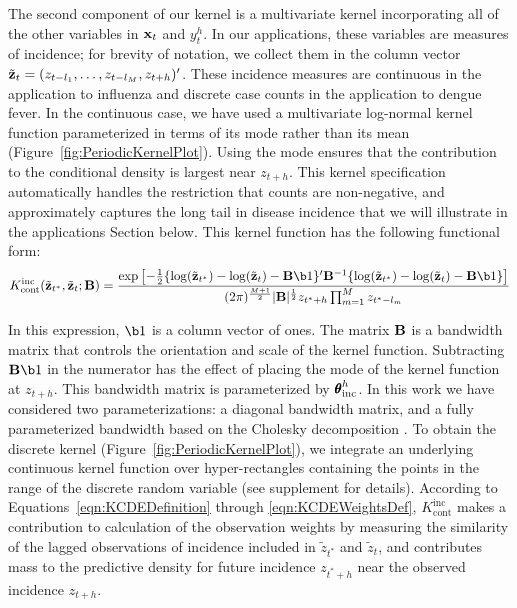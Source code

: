 \documentclass[times, doublespace]{simauth}\usepackage[]{graphicx}\usepackage[]{color}
\begin{document}
The second component of our kernel is a multivariate kernel incorporating
all of the other variables in ${\bf x}_t$ and $y_t^h$.  In our
applications, these variables are measures of incidence; for brevity of
notation, we collect them in the column vector
$\tilde{{\bf z}}_t = (z_{t - l_1}, \ldots, z_{t - l_M}, z_{t + h})'$.
These incidence measures are continuous in the application to influenza and
discrete case counts in the application to dengue fever.  In the continuous
case, we have used a multivariate log-normal kernel function parameterized in
terms of its mode rather than its mean (Figure~\ref{fig:PeriodicKernelPlot}).
Using the mode ensures that the contribution to the conditional density
is largest near $z_{t + h}$.
This kernel specification automatically handles the restriction that counts are
non-negative, and approximately captures the long tail in disease incidence that
we will illustrate in the applications Section below.  This kernel function has
the following functional form:
\begin{equation}
K^{\text{inc}}_{\text{cont}}(\tilde{\bz}_{t^*}, \tilde{\bz}_{t}; \bB) = \frac{\exp\left[ -\frac{1}{2} \{\log(\tilde{\bz}_{t^*}) - \log(\tilde{\bz}_t) - \bB \b1\}' \bB^{-1} \{\log(\tilde{\bz}_{t^*}) - \log(\tilde{\bz}_t) - \bB \b1\} \right]}{(2 \pi)^{\frac{M+1}{2}} \vert \bB \vert^{\frac{1}{2}} z_{t^* + h} \prod_{m = 1}^M z_{t^* - l_m} }
\end{equation}

In this expression, $\b1$ is a column vector of ones.
The matrix ${\bf B}$ is a bandwidth matrix that
controls the orientation and scale of the kernel function.  Subtracting $\bB \b1$ in the numerator has the effect of placing the mode of the kernel function at $z_{t + h}$.  This bandwidth
matrix is parameterized by $\btheta^h_{\text{inc}}$.  In this work we have considered
two parameterizations: a diagonal bandwidth matrix, and a fully parameterized
bandwidth based on the Cholesky decomposition \cite{trefethen1997numericalLA}.  To obtain the
discrete kernel (Figure~\ref{fig:PeriodicKernelPlot}), we integrate an
underlying continuous kernel function over hyper-rectangles containing the
points in the range of the discrete random variable (see supplement for details).
According to Equations~\eqref{eqn:KCDEDefinition} through \eqref{eqn:KCDEWeightsDef}, $K^{\text{inc}}_{\text{cont}}$ makes a contribution to calculation of the observation weights by measuring the similarity of the lagged observations of incidence included in $\tilde{z}_{t^*}$ and $\tilde{z}_{t}$, and contributes mass to the predictive density for future incidence $z_{t^* + h}$ near the observed incidence $z_{t + h}$.
\end{document}
